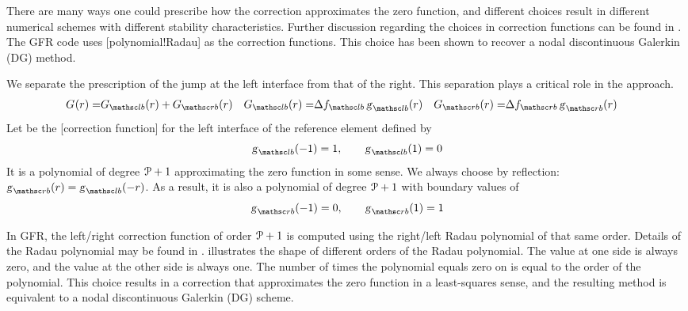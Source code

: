 
There are many ways one could prescribe how the correction approximates
the zero function, and different choices result in different
numerical schemes with different stability characteristics.
%
Further discussion regarding the choices in correction functions can be found
in .
%
The GFR code uses [polynomial!Radau]
as the correction functions.
%
This choice has been shown to recover a nodal discontinuous Galerkin (DG)
method.


We separate the prescription of the jump at the left interface from that of
the right.
%
This separation plays a critical role in the approach.
%
\begin{align}
   \G\pvp[r] =& \GL\pvp[r]   +  \GR\pvp[r] &
  \GL\pvp[r] =& \fluxjumpL{} \, \gL\pvp[r] &
  \GR\pvp[r] =& \fluxjumpR{} \, \gR\pvp[r]
\end{align}
%
Let \gL{} be the [correction function]
for the left interface of the reference element defined by
%
\begin{equation}
  \gL\pvp[-1] = 1, \qquad
  \gL\pvp[ 1] = 0
\end{equation}
%
It is a polynomial of degree ${\cal P}+1$ approximating the zero function in
some sense.
%
We always choose \gR{} by reflection: $\gR\pvp[\rv]=\gL\pvp[-\rv]$.
%
As a result, it is also a polynomial of degree ${\cal P}+1$ with
boundary values of
%
\begin{equation}
  \gR\pvp[-1] = 0, \qquad
  \gR\pvp[ 1] = 1
\end{equation}


In GFR, the left\slash right correction function of order ${\cal P}+1$ is computed
using the right\slash left Radau polynomial of that same order.
%
Details of the Radau polynomial may be found in .
%
 illustrates the shape of different orders of the
Radau polynomial.
%
The value at one side is always zero, and the value at the other side
is always one.
%
The number of times the polynomial equals zero on \stdelem{} is equal to the
order of the polynomial.
%
This choice results in a correction that approximates the zero function
in a least-squares sense, and the resulting method is equivalent to a
nodal discontinuous Galerkin (DG) scheme.

